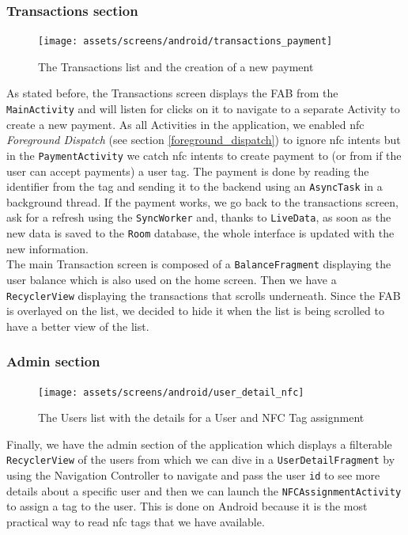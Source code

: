\documentclass[twoside, openright,11pt,a4paper]{book}
\begin{document}
\subsubsection{Transactions section}
\begin{figure}[H]
\begin{center}
	\texttt{[image: assets/screens/android/transactions\_payment]}
	\caption{The Transactions list and the creation of a new payment}
\end{center}
\end{figure}
As stated before, the Transactions screen displays the FAB from the \verb+MainActivity+ and will listen for clicks on it to navigate to a separate Activity to create a new payment. As all Activities in the application, we enabled \gls{nfc} \emph{Foreground Dispatch} (see section \ref{foreground_dispatch}) to ignore \gls{nfc} intents but in the \verb+PaymentActivity+ we catch \gls{nfc} intents to create payment to (or from if the user can accept payments) a user tag. The payment is done by reading the identifier from the tag and sending it to the backend using an \verb+AsyncTask+  in a background thread. If the payment works, we go back to the transactions screen, ask for a refresh using the \verb+SyncWorker+ and, thanks to \verb+LiveData+, as soon as the new data is saved to the \verb+Room+ database, the whole interface is updated with the new information.\\

The main Transaction screen is composed of a \verb+BalanceFragment+ displaying the user balance which is also used on the home screen. Then we have a \verb+RecyclerView+ displaying the transactions that scrolls underneath. Since the FAB is overlayed on the list, we decided to hide it when the list is being scrolled to have a better view of the list.

\subsubsection{Admin section}
\begin{figure}[H]
\begin{center}
	\texttt{[image: assets/screens/android/user\_detail\_nfc]}
	\caption{The Users list with the details for a User and NFC Tag assignment}
\end{center}
\end{figure}
Finally, we have the admin section of the application which displays a filterable \verb+RecyclerView+ of the users from which we can dive in a \verb+UserDetailFragment+ by using the Navigation Controller to navigate and pass the user \verb+id+ to see more details about a specific user and then we can launch the \verb+NFCAssignmentActivity+ to assign a tag to the user. This is done on Android because it is the most practical way to read \gls{nfc} tags that we have available. \\
\end{document}
